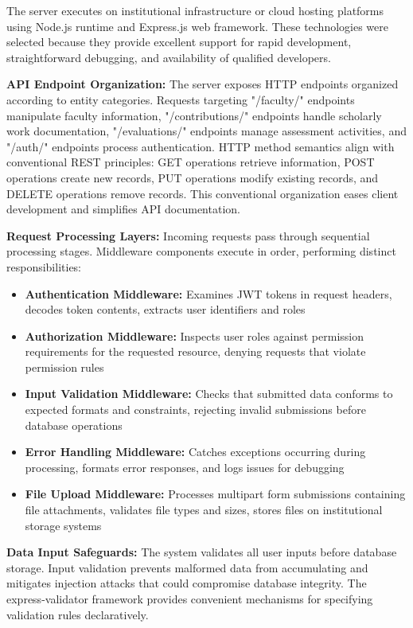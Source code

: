 \documentclass[conference]{IEEEtran}
\begin{document}
The server executes on institutional infrastructure or cloud hosting platforms using Node.js runtime and Express.js web framework. These technologies were selected because they provide excellent support for rapid development, straightforward debugging, and availability of qualified developers.

\textbf{API Endpoint Organization:} The server exposes HTTP endpoints organized according to entity categories. Requests targeting "/faculty/" endpoints manipulate faculty information, "/contributions/" endpoints handle scholarly work documentation, "/evaluations/" endpoints manage assessment activities, and "/auth/" endpoints process authentication. HTTP method semantics align with conventional REST principles: GET operations retrieve information, POST operations create new records, PUT operations modify existing records, and DELETE operations remove records. This conventional organization eases client development and simplifies API documentation.

\textbf{Request Processing Layers:} Incoming requests pass through sequential processing stages. Middleware components execute in order, performing distinct responsibilities:
\begin{itemize}
\item \textbf{Authentication Middleware:} Examines JWT tokens in request headers, decodes token contents, extracts user identifiers and roles
\item \textbf{Authorization Middleware:} Inspects user roles against permission requirements for the requested resource, denying requests that violate permission rules
\item \textbf{Input Validation Middleware:} Checks that submitted data conforms to expected formats and constraints, rejecting invalid submissions before database operations
\item \textbf{Error Handling Middleware:} Catches exceptions occurring during processing, formats error responses, and logs issues for debugging
\item \textbf{File Upload Middleware:} Processes multipart form submissions containing file attachments, validates file types and sizes, stores files on institutional storage systems
\end{itemize}

\textbf{Data Input Safeguards:} The system validates all user inputs before database storage. Input validation prevents malformed data from accumulating and mitigates injection attacks that could compromise database integrity. The express-validator framework provides convenient mechanisms for specifying validation rules declaratively.
\end{document}
